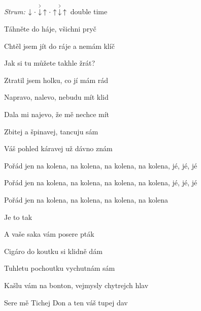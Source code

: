 \begin{song}


\begin{headerbox}
\RaiseBoxWithChucks
\textit{Strum:} $\Down\Miss\AccentDown\Up\Miss\Up\AccentDown\Up$ double time
\end{headerbox}

\begin{hchordbox}
\end{hchordbox}

\Large

\bigskip

Táhněte do háje, všichni pryč \par
Chtěl jsem jít do ráje a nemám klíč \par
Jak si tu můžete takhle žrát? \par
Ztratil jsem holku, co jí mám rád \par

\bigskip

Napravo, nalevo, nebudu mít klid \par
Dala mi najevo, že mě nechce mít \par
Zbitej a špinavej, tancuju sám \par
Váš pohled káravej už dávno znám \par

\bigskip

Pořád jen na kolena, na kolena, na kolena, na kolena, jé, jé, jé \par
Pořád jen na kolena, na kolena, na kolena, na kolena, jé, jé, jé \par
Pořád jen na kolena, na kolena, na kolena, na kolena \par
{} Je to tak \par
A vaše saka vám posere pták \par

\bigskip

Cigáro do koutku si klidně dám \par
Tuhletu pochoutku vychutnám sám \par
Kašlu vám na bonton, vejmysly chytrejch hlav \par
Sere mě Tichej Don a ten váš tupej dav \par


\end{song}
